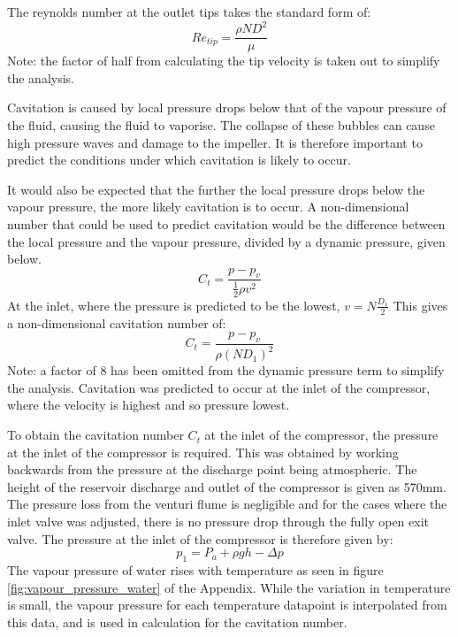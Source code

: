 \documentclass{article}
\begin{document}
The reynolds number at the outlet tips takes the standard form of:
\begin{equation}
    Re_{tip} = \frac{\rho ND^2}{\mu}
\end{equation}
Note: the factor of half from calculating the tip velocity is taken out to simplify the analysis.

Cavitation is caused by local pressure drops below that of the vapour pressure of the fluid, causing the fluid to vaporise.
The collapse of these bubbles can cause high pressure waves and damage to the impeller.
It is therefore important to predict the conditions under which cavitation is likely to occur.

It would also be expected that the further the local pressure drops below the vapour pressure, the more likely cavitation is to occur.
A non-dimensional number that could be used to predict cavitation would be the difference between the local pressure and the vapour pressure, divided by a dynamic pressure, given below.
\begin{equation}
    C_t = \frac{p - p_v}{\frac{1}{2}\rho v^2}
\end{equation}
At the inlet, where the pressure is predicted to be the lowest, $v = N \frac{D_1}{2}$
This gives a non-dimensional cavitation number of:
\begin{equation}
    C_t = \frac{p - p_v}{\rho (ND_1)^2}
\end{equation}
Note: a factor of 8 has been omitted from the dynamic pressure term to simplify the analysis.
Cavitation was predicted to occur at the inlet of the compressor, where the velocity is highest and so pressure lowest.

To obtain the cavitation number $C_t$ at the inlet of the compressor, the pressure at the inlet of the compressor is required.
This was obtained by working backwards from the pressure at the discharge point being atmospheric.
The height of the reservoir discharge and outlet of the compressor is given as 570mm. The pressure loss from the
venturi flume is negligible and for the cases where the inlet valve was adjusted, there is no pressure drop through the fully open exit valve.
The pressure at the inlet of the compressor is therefore given by:
\begin{equation}
    p_1 =  P_a + \rho g h - \Delta p
\end{equation}
The vapour pressure of water rises with temperature as seen in figure \ref{fig:vapour_pressure_water} of the Appendix.
While the variation in temperature is small, the vapour pressure for each temperature datapoint is interpolated from this data, and is used in calculation for the cavitation number.
\end{document}
